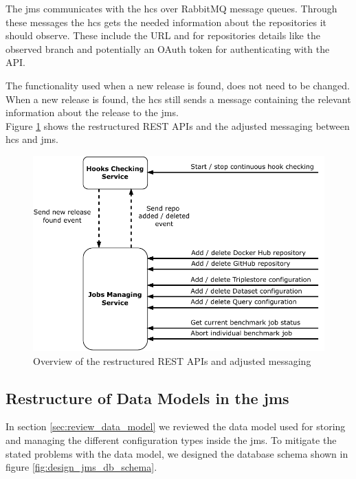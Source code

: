 The \ac{jms} communicates with the \ac{hcs} over RabbitMQ message queues.
Through these messages the \ac{hcs} gets the needed information about the repositories it should observe.
These include the URL and for \gh{} repositories details like the observed branch and potentially an OAuth token for authenticating with the API.

The functionality used when a new release is found, does not need to be changed.
When a new release is found, the \ac{hcs} still sends a message containing the relevant information about the release to the \ac{jms}.
\\

Figure \ref{fig:repo_management_restructure} shows the restructured REST APIs and the adjusted messaging between \ac{hcs} and \ac{jms}.

\begin{figure}[tbph]
	\centering
	\includegraphics[width=.65\textwidth]{figures/messaging-implementation-hcs-jms.pdf}
	\caption{Overview of the restructured REST APIs and adjusted messaging}
	\label{fig:repo_management_restructure}
\end{figure}



\subsection{Restructure of Data Models in the \acl{jms}}
\label{sec:data_model_restructure_jms}
In section \ref{sec:review_data_model} we reviewed the data model used for storing and managing the different configuration types inside the \ac{jms}.
To mitigate the stated problems with the data model, we designed the database schema shown in figure \ref{fig:design_jms_db_schema}.

